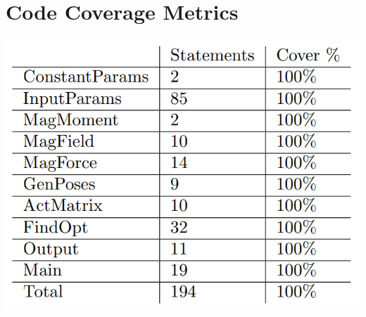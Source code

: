 \documentclass[12pt, titlepage]{article}
\begin{document}
\section{Code Coverage Metrics}
\begin{center}
  \includegraphics[scale=0.7]{Coverage.PNG} \\
  \label{tracemod}
\end{center}


\newpage


\end{document}
